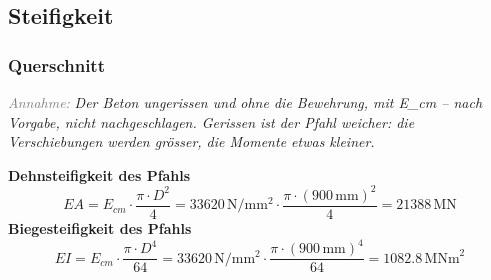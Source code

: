 \documentclass[11pt,a4paper]{article}
\newcommand{\hinweis}[2]{\par\noindent\textcolor{gray}{\textit{#1:}} \textit{#2}\par}
\begin{document}
\subsection{Steifigkeit}
\subsubsection{Querschnitt}
\hinweis{Annahme}{Der Beton ungerissen und ohne die Bewehrung, mit E\_cm -- nach Vorgabe, nicht nachgeschlagen. Gerissen ist der Pfahl weicher: die Verschiebungen werden grösser, die Momente etwas kleiner.}
\noindent\textbf{Dehnsteifigkeit des Pfahls}
\begin{equation*}
EA = E_{cm} \cdot \frac{\pi \cdot D^{2}}{4} = 33620\,\mathrm{N}/\mathrm{mm}^{2} \cdot \frac{\pi \cdot \left(900\,\mathrm{mm}\right)^{2}}{4} = 21388\,\mathrm{MN}
\end{equation*}
\noindent\textbf{Biegesteifigkeit des Pfahls}
\begin{equation*}
EI = E_{cm} \cdot \frac{\pi \cdot D^{4}}{64} = 33620\,\mathrm{N}/\mathrm{mm}^{2} \cdot \frac{\pi \cdot \left(900\,\mathrm{mm}\right)^{4}}{64} = 1082.8\,\mathrm{MNm}^{2}
\end{equation*}
\end{document}

